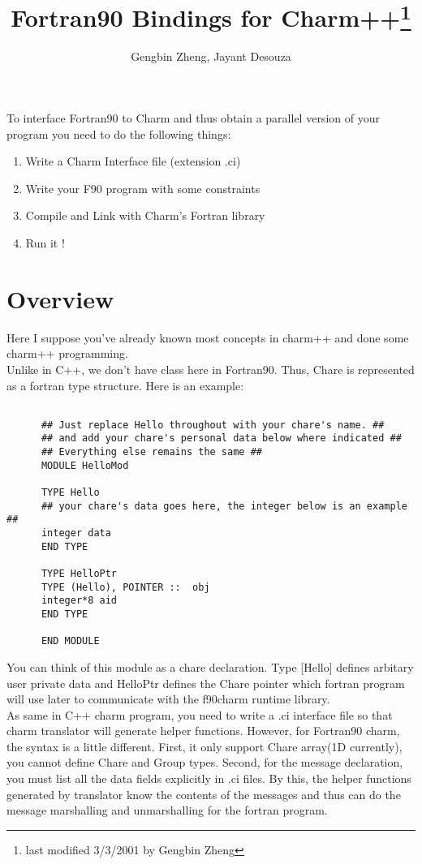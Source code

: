 \documentclass[11pt]{article}
\title{Fortran90 Bindings for Charm++\footnote{last modified 3/3/2001 by Gengbin Zheng}}
\author{Gengbin Zheng, Jayant Desouza}
\begin{document}
\maketitle

To interface Fortran90 to Charm and thus obtain a parallel version of
your program you need to do the following things:
\begin{enumerate}
\item Write a Charm Interface file (extension .ci)
\item Write your F90 program with some constraints
\item Compile and Link with Charm's Fortran library
\item Run it !
\end{enumerate}

\section{Overview}

Here I suppose you've already known most concepts in charm++ and done some 
charm++ programming.  \\
Unlike in C++, we don't have class here in Fortran90. Thus, Chare is 
represented as a fortran type structure. Here is an example:

\begin{verbatim}

      ## Just replace Hello throughout with your chare's name. ##
      ## and add your chare's personal data below where indicated ##
      ## Everything else remains the same ##
      MODULE HelloMod

      TYPE Hello
      ## your chare's data goes here, the integer below is an example ##
      integer data
      END TYPE

      TYPE HelloPtr
      TYPE (Hello), POINTER ::  obj
      integer*8 aid
      END TYPE

      END MODULE
\end{verbatim}
You can think of this module as a chare declaration. Type [Hello] defines 
arbitary user private data and HelloPtr defines the Chare pointer which 
fortran program will use later to communicate with the f90charm runtime 
library. \\
As same in C++ charm program, you need to write a .ci interface file
so that charm translator will generate helper functions. However, for
Fortran90 charm, the syntax is a little different. First, it only support
Chare array(1D currently), you cannot define Chare and Group types. Second, 
for the message declaration, you must list all the data fields explicitly in
.ci files.  By this, the helper functions generated by translator know the 
contents of the messages and thus can do the message marshalling and 
unmarshalling for the fortran program. 
\end{document}
